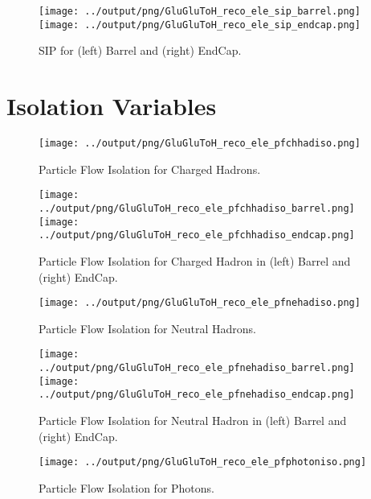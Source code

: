 \documentclass[11pt]{book}
\begin{document}
\begin{figure}[ht]
\centering
\texttt{[image: ../output/png/GluGluToH\_reco\_ele\_sip\_barrel.png]}
\texttt{[image: ../output/png/GluGluToH\_reco\_ele\_sip\_endcap.png]}
\caption{SIP for (left) Barrel and (right) EndCap.}
\label{fig:gluglu_reco_ele_sip_regions}
\end{figure}
\clearpage

\section{Isolation Variables}

\begin{figure}[ht]
\centering
\texttt{[image: ../output/png/GluGluToH\_reco\_ele\_pfchhadiso.png]}
\caption{Particle Flow Isolation for Charged Hadrons.}
\label{fig:gluglu_reco_ele_pfchhadiso}
\end{figure}

\begin{figure}[ht]
\centering
\texttt{[image: ../output/png/GluGluToH\_reco\_ele\_pfchhadiso\_barrel.png]}
\texttt{[image: ../output/png/GluGluToH\_reco\_ele\_pfchhadiso\_endcap.png]}
\caption{Particle Flow Isolation for Charged Hadron in (left) Barrel and (right) EndCap.}
\label{fig:gluglu_reco_ele_pfchhadiso_regions}
\end{figure}

\begin{figure}[ht]
\centering
\texttt{[image: ../output/png/GluGluToH\_reco\_ele\_pfnehadiso.png]}
\caption{Particle Flow Isolation for Neutral Hadrons.}
\label{fig:gluglu_reco_ele_pfnehadiso}
\end{figure}

\begin{figure}[ht]
\centering
\texttt{[image: ../output/png/GluGluToH\_reco\_ele\_pfnehadiso\_barrel.png]}
\texttt{[image: ../output/png/GluGluToH\_reco\_ele\_pfnehadiso\_endcap.png]}
\caption{Particle Flow Isolation for Neutral Hadron in (left) Barrel and (right) EndCap.}
\label{fig:gluglu_reco_ele_pfnehadiso_regions}
\end{figure}

\begin{figure}[ht]
\centering
\texttt{[image: ../output/png/GluGluToH\_reco\_ele\_pfphotoniso.png]}
\caption{Particle Flow Isolation for Photons.}
\label{fig:gluglu_reco_ele_pfphotoniso}
\end{figure}
\end{document}
